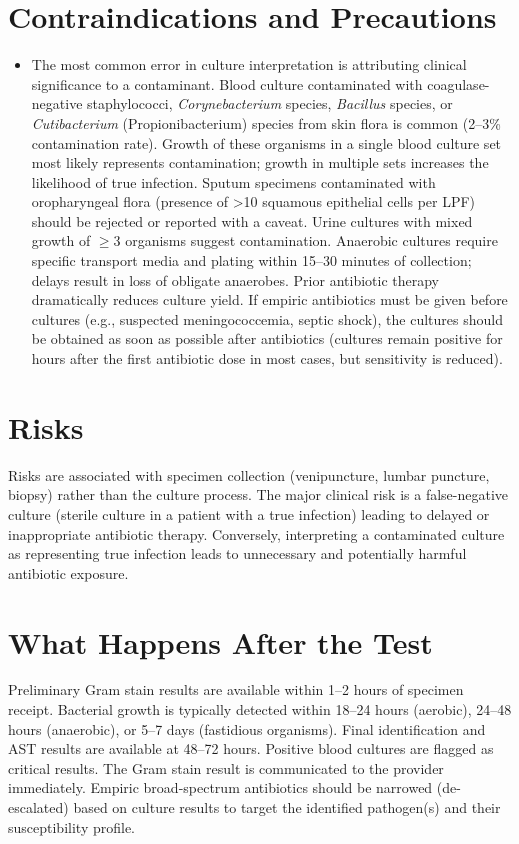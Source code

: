 \section*{Contraindications and Precautions}
\begin{itemize}
  \item The most common error in culture interpretation is attributing clinical significance to a contaminant. Blood culture contaminated with coagulase-negative staphylococci, \textit{Corynebacterium} species, \textit{Bacillus} species, or \textit{Cutibacterium} (Propionibacterium) species from skin flora is common (2--3\% contamination rate). Growth of these organisms in a single blood culture set most likely represents contamination; growth in multiple sets increases the likelihood of true infection. Sputum specimens contaminated with oropharyngeal flora (presence of >10 squamous epithelial cells per LPF) should be rejected or reported with a caveat. Urine cultures with mixed growth of $\geq$3 organisms suggest contamination. Anaerobic cultures require specific transport media and plating within 15--30 minutes of collection; delays result in loss of obligate anaerobes. Prior antibiotic therapy dramatically reduces culture yield. If empiric antibiotics must be given before cultures (e.g., suspected meningococcemia, septic shock), the cultures should be obtained as soon as possible after antibiotics (cultures remain positive for hours after the first antibiotic dose in most cases, but sensitivity is reduced).
\end{itemize}
\section*{Risks}
Risks are associated with specimen collection (venipuncture, lumbar puncture, biopsy) rather than the culture process. The major clinical risk is a false-negative culture (sterile culture in a patient with a true infection) leading to delayed or inappropriate antibiotic therapy. Conversely, interpreting a contaminated culture as representing true infection leads to unnecessary and potentially harmful antibiotic exposure.

\section*{What Happens After the Test}
Preliminary Gram stain results are available within 1--2 hours of specimen receipt. Bacterial growth is typically detected within 18--24 hours (aerobic), 24--48 hours (anaerobic), or 5--7 days (fastidious organisms). Final identification and AST results are available at 48--72 hours. Positive blood cultures are flagged as critical results. The Gram stain result is communicated to the provider immediately. Empiric broad-spectrum antibiotics should be narrowed (de-escalated) based on culture results to target the identified pathogen(s) and their susceptibility profile.

